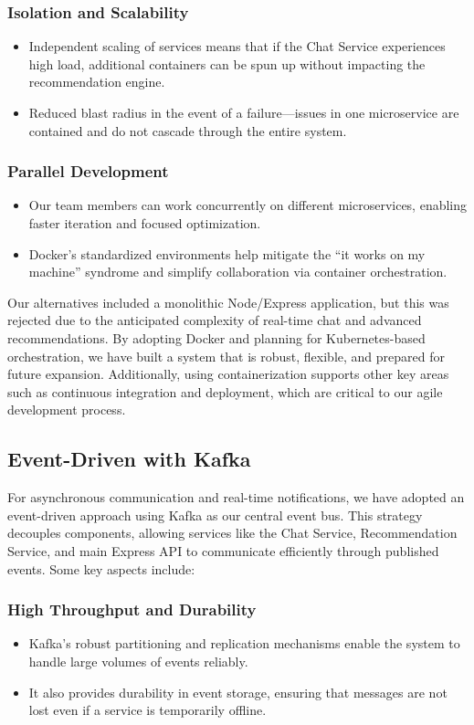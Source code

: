 \documentclass{FastFyp}
\begin{document}
\subsubsection{Isolation and Scalability}
    \begin{itemize}
        \item Independent scaling of services means that if the Chat Service experiences high load, additional containers can be spun up without impacting the recommendation engine.
        \item Reduced blast radius in the event of a failure—issues in one microservice are contained and do not cascade through the entire system.
    \end{itemize}
\subsubsection{Parallel Development}
    \begin{itemize}
        \item   Our team members can work concurrently on different microservices, enabling faster iteration and focused optimization.
        \item Docker’s standardized environments help mitigate the “it works on my machine” syndrome and simplify collaboration via container orchestration.
    \end{itemize}

Our alternatives included a monolithic Node/Express application, but this was rejected due to the anticipated complexity of real-time chat and advanced recommendations. By adopting Docker and planning for Kubernetes-based orchestration, we have built a system that is robust, flexible, and prepared for future expansion. Additionally, using containerization supports other key areas such as continuous integration and deployment, which are critical to our agile development process.

\subsection{Event-Driven with Kafka} 
For asynchronous communication and real-time notifications, we have adopted an event-driven approach using Kafka as our central event bus. This strategy decouples components, allowing services like the Chat Service, Recommendation Service, and main Express API to communicate efficiently through published events. Some key aspects include:


\subsubsection{High Throughput and Durability}
    \begin{itemize}
        \item Kafka’s robust partitioning and replication mechanisms enable the system to handle large volumes of events reliably.
        \item It also provides durability in event storage, ensuring that messages are not lost even if a service is temporarily offline.
    \end{itemize}
\end{document}
